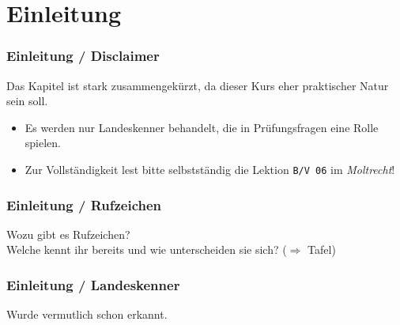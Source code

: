 

\subtitle{Betriebstechnik/Vorschriften 06: \\
          Rufzeichen - Landeskenner \\[2em]}
\date{Stand 20.11.2014}



\section{Einleitung}

\begin{frame}
    \frametitle{Einleitung / Disclaimer}

    \begin{center}
        \Large{Das Kapitel ist stark zusammengekürzt, da dieser Kurs eher
        praktischer Natur sein soll.}
    \end{center}

    \normalsize

    \begin{itemize}
        \item Es werden nur Landeskenner behandelt, die in Prüfungsfragen eine Rolle spielen.
        \item Zur Vollständigkeit lest bitte selbstständig die Lektion
              \texttt{B/V 06} im \emph{Moltrecht}!
    \end{itemize}

\end{frame}


\begin{frame}
    \frametitle{Einleitung / Rufzeichen}

    \begin{center}
        \Large{Wozu gibt es Rufzeichen?} \\[1em]
        \Large{Welche kennt ihr bereits und wie unterscheiden sie sich? ($\Rightarrow$ Tafel)}
    \end{center}

\end{frame}

\begin{frame}
    \frametitle{Einleitung / Landeskenner}

    \begin{center}
        \Large{Wurde vermutlich schon erkannt.}
    \end{center}

\end{frame}

